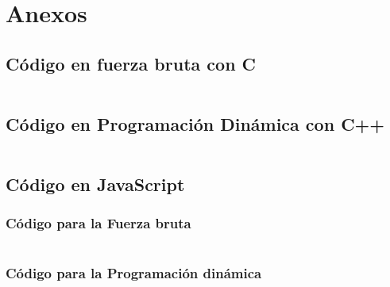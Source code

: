 \documentclass[12 pt]{report}
\begin{document}
\chapter{Anexos}
\section{Código en fuerza bruta con C}
\inputminted{C}{../solucionBruta.c}
\section{Código en Programación Dinámica con C++}
\inputminted{cpp}{../solucionDp2.cpp}
\section{Código en JavaScript}
\subsection{Código para la Fuerza bruta}
\inputminted{js}{../PaginaWeb/js/main.js}
\subsection{Código para la Programación dinámica}
\inputminted{js}{../PaginaWeb/js/dp.js}
\end{document}
